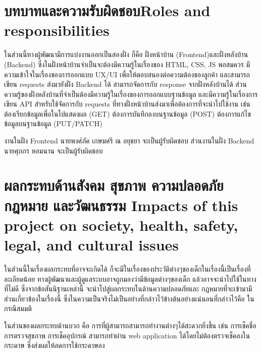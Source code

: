 \section{\ifcpe บทบาทและความรับผิดชอบ\else Roles and responsibilities\fi}
ในส่วนนี้ทางผู้พัฒนามีการแบ่งงานออกเป็นสองฝั่ง ก็คือ ฝั่งหน้าบ้าน 
(Frontend)และฝั่งหลังบ้าน (Backend) ซึ่งในฝั่งหน้าบ้านจำเป็นจะต้องมีความรู้ในเรื่องของ HTML, CSS, JS พอสมควร มีความเข้าใจในเรื่องของการออกแบบ UX/UI เพื่อให้ตอบสนองต่อความต้องของลูกค้า และสามารถเขียน requests ส่งมายังฝั่ง Backend ได้ สามารถจัดการกับ response จากฝั่งหลังบ้านได้ ส่วนความรู้ของฝั่งหลังบ้านที่จำเป็นต้องมีความรู้ในเรื่องของการออกแบบฐานข้อมูล  และมีความรู้ในเรื่องการเขียน API  สำหรับใช้จัดการกับ requests ที่ทางฝั่งหน้าบ้านส่งมาเพื่อต้องการที่จะนำไปใช้งาน เช่น ต้องเรียกข้อมูลเพื่อในไปแสดงผล (GET)
ต้องการบันทึกลงบนฐานข้อมูล (POST) ต้องการแก้ไขข้อมูลบนฐานข้อมูล (PUT/PATCH)

งานในฝั่ง Frontend นายพงศ์ภัค เกษมศรี ณ อยุธยา จะเป็นผู้รับผิดชอบ 
ส่วนงานในฝั่ง Backend นายศุภกร หอมนาน  จะเป็นผู้รับผิดชอบ


\section{\ifcpe%
ผลกระทบด้านสังคม สุขภาพ ความปลอดภัย กฎหมาย และวัฒนธรรม
\else%
Impacts of this project on society, health, safety, legal, and cultural issues
\fi}

ในส่วนนี้ในเรื่องผลกระทบที่อาจจะเกิดได้ ก็จะมีในเรื่องของประวัติต่างๆของเด็กในเรื่องนี้เป็นเรื่องที่ละเอียดน้อย ทางผู้พัฒนาและผู้ดูแลระบบอาจถูกมองว่ามีข้อมูลต่างๆของเด็ก แล้วอาจจะนำไปใช้ในทางที่ไม่ดี  ซึ่งจากข้อสันนิฐานเหล่านี้ จะนำไปสู่ผลกระทบในด้านความปลอดภัยและ กฏหมายที่จะเข้ามามีส่วนเกี่ยวข้องในเรื่องนี้ ซึ่งในความเป็นจริงไม่เป็นอย่างที่กล่าวไว้ข้างต้นอย่างแน่นอนที่กล่าวไว้คือ ในกรณีสมมติ 

ในส่วนของผลกระทบด้านบวก คือ การที่ผู้สามารถสามารถทำงานต่างๆได้สะดวกยิ่งขึ้น เช่น การเช็คชื่อ การตรวจสุขภาพ การเช็คอุปกรณ์ สามารถทำผ่าน web application ได้โดยไม่ต้องตรวจเช็คลงในกระดาษ ซึ่งส่งผลให้ลดการใช้กระดาษลง

